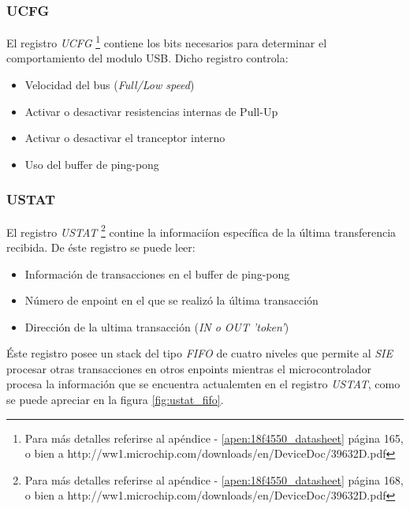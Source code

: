 \subsubsection{UCFG}
El registro \emph{UCFG} \footnote{Para m\'as detalles referirse al
ap\'endice - \ref{apen:18f4550_datasheet} p\'agina 165, o bien a
http://ww1.microchip.com/downloads/en/DeviceDoc/39632D.pdf} contiene los bits
necesarios para determinar el comportamiento del modulo USB. Dicho registro
controla:

\begin{itemize}
 \item Velocidad del bus (\emph{Full/Low speed})

 \item Activar o desactivar resistencias internas de Pull-Up

 \item Activar o desactivar el tranceptor interno

 \item Uso del buffer de ping-pong
\end{itemize}

\subsubsection{USTAT}
El registro \emph{USTAT} \footnote{Para m\'as detalles referirse al
ap\'endice - \ref{apen:18f4550_datasheet} p\'agina 168, o bien a
http://ww1.microchip.com/downloads/en/DeviceDoc/39632D.pdf} contine la
informaci\'ion espec\'ifica de la \'ultima transferencia recibida. De \'este
registro se puede leer:

\begin{itemize}
 \item Informaci\'on de transacciones en el buffer de ping-pong

 \item N\'umero de enpoint en el que se realiz\'o la \'ultima transacci\'on

 \item Direcci\'on de la ultima transacci\'on (\emph{IN o OUT 'token'})
\end{itemize}

\'Este registro posee un stack del tipo \emph{FIFO} de cuatro niveles que
permite al \emph{SIE} procesar otras transacciones en otros enpoints mientras
el microcontrolador procesa la informaci\'on que se encuentra actualemten en
el registro \emph{USTAT}, como se puede apreciar en la figura
\ref{fig:ustat_fifo}.

